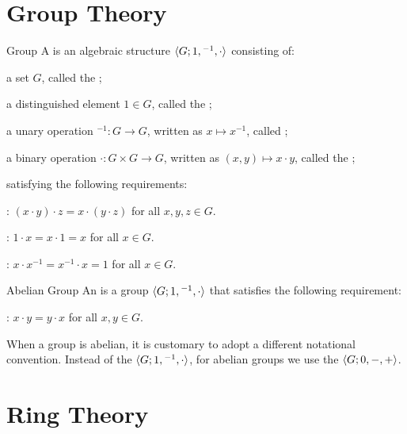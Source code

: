\documentclass[12pt]{report}
\begin{document}
\chapter{Group Theory}

\begin{dfnbox}{Group}
	A  is an algebraic structure ${\langle {G; 1, {}^{-1}, \cdot} \rangle}$ consisting of:
	\begin{dfnitems}
		\item a set $G$, called the ;
		\item a distinguished element $1 \in G$, called the ;
		\item a unary operation ${}^{-1}: G \to G$, written as $x \mapsto x^{-1}$, called ;
		\item a binary operation $\cdot: G \times G \to G$, written as $(x, y) \mapsto x \cdot y$, called the ;
	\end{dfnitems}
	satisfying the following requirements:
	\begin{dfnitems}
		\item {}: $(x \cdot y) \cdot z = x \cdot (y \cdot z)$ for all $x, y, z \in G$.
		\item {}: $1 \cdot x = x \cdot 1 = x$ for all $x \in G$.
		\item {}: $x \cdot x^{-1} = x^{-1} \cdot x = 1$ for all $x \in G$.
	\end{dfnitems}
\end{dfnbox}

\begin{dfnbox}{Abelian Group}
	An  is a group ${\langle {G; 1, {}^{-1}, \cdot} \rangle}$ that satisfies the following requirement:
	\begin{dfnitems}
		\item {}: $x \cdot y = y \cdot x$ for all $x, y \in G$.
	\end{dfnitems}
\end{dfnbox}

When a group is abelian, it is customary to adopt a different notational convention. Instead of the  ${\langle {G; 1, {}^{-1}, \cdot} \rangle}$, for abelian groups we use the  ${\langle {G; 0, -, +} \rangle}$.



\chapter{Ring Theory}
\end{document}
